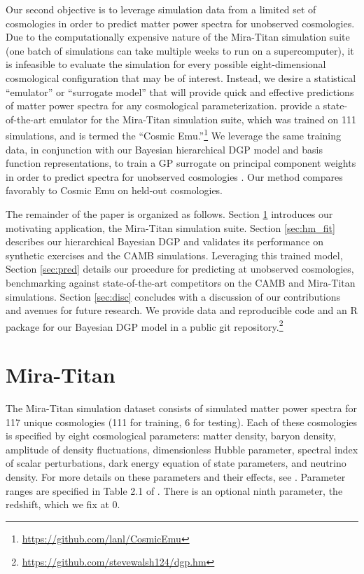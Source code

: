 \documentclass[11pt]{article}
\begin{document}
Our second objective is to leverage simulation data from a limited set of
cosmologies in order to predict matter power spectra for unobserved cosmologies.
Due to the computationally expensive nature of the Mira-Titan simulation suite
(one batch of simulations can take multiple weeks to run on a supercomputer),
it is infeasible to evaluate the simulation for every possible eight-dimensional
cosmological configuration that may be of interest.  Instead, we desire
a statistical ``emulator'' or ``surrogate model'' 
\citep{santner2003design,gramacy2020surrogates} that will provide quick and effective
predictions of matter power spectra for any cosmological parameterization.
\citet{moran2023mira} provide a state-of-the-art emulator for the Mira-Titan
simulation suite, which was trained on 111 simulations, and is termed 
the ``Cosmic Emu.''\footnote{\url{https://github.com/lanl/CosmicEmu}}
We leverage the same training data, in conjunction with our Bayesian hierarchical
DGP model and basis function representations, to train a GP surrogate 
on principal component weights in order to predict spectra for unobserved
cosmologies \citep{higdon2008computer, higdon2010estcosmo}. 
Our method compares favorably to Cosmic Emu on held-out cosmologies.

The remainder of the paper is organized as follows.  Section \ref{sec:data} 
introduces our motivating application, the Mira-Titan simulation suite.  
Section \ref{sec:hm_fit} describes our hierarchical Bayesian DGP and 
validates its performance on synthetic exercises and the CAMB simulations.  
Leveraging this trained model, Section \ref{sec:pred} details 
our procedure for predicting at unobserved cosmologies, benchmarking against
state-of-the-art competitors on the CAMB and Mira-Titan simulations. 
Section \ref{sec:disc} concludes with a discussion of our contributions and avenues for 
future research.  We provide data and reproducible code and an {\sf R} package for our 
Bayesian DGP model in a public git repository.\footnote{\url{https://github.com/stevewalsh124/dgp.hm}}

\section{Mira-Titan}
\label{sec:data}

The Mira-Titan simulation dataset consists of simulated matter power spectra for 
117 unique cosmologies (111 for training, 6 for testing). 
Each of these cosmologies is specified by eight cosmological 
parameters: matter density, baryon density, amplitude of density fluctuations, 
dimensionless Hubble parameter, spectral index of scalar perturbations,
dark energy equation of state parameters, and neutrino density. For more details 
on these parameters and their effects, see \cite{dodelson2020modern, aghanim2020planck, heitmann2016mira}. 
Parameter ranges are specified in Table 2.1 of \cite{moran2023mira}.
There is an optional ninth parameter, the redshift, which we fix at 0.
\end{document}
